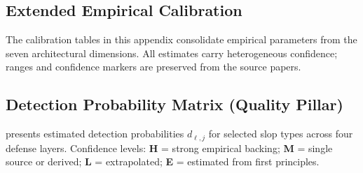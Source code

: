 \documentclass[11pt, a4paper]{googledeepmind}
\begin{document}
\begin{appendices}


\section{Extended Empirical Calibration}
\label{app:calibration}

The calibration tables in this appendix consolidate empirical parameters
from the seven architectural dimensions. All estimates carry heterogeneous confidence;
ranges and confidence markers are preserved from the source papers.

\subsection{Detection Probability Matrix (Quality Pillar)}
\label{app:detection-matrix}

 presents estimated detection probabilities
$d_{\ell,j}$ for selected slop types across four defense layers.
Confidence levels: \textbf{H} = strong empirical backing;
\textbf{M} = single source or derived; \textbf{L} = extrapolated;
\textbf{E} = estimated from first principles.


\end{appendices}
\end{document}
